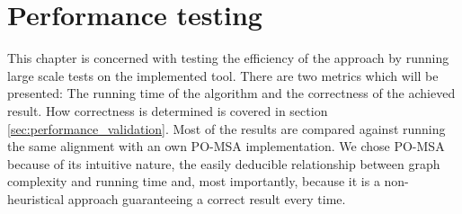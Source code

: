 \documentclass[thesis.tex]{subfiles}
\begin{document}
\chapter{Performance testing}
\label{sec:performance}
This chapter is concerned with testing the efficiency of the approach by running large scale tests on the implemented tool. There are two metrics which will be presented: The running time of the algorithm and the correctness of the achieved result. How correctness is determined is covered in section \ref{sec:performance_validation}. Most of the results are compared against running the same alignment with an own PO-MSA implementation. We chose PO-MSA because of its intuitive nature, the easily deducible relationship between graph complexity and running time and, most importantly, because it is a non-heuristical approach guaranteeing a correct result every time.
\end{document}
